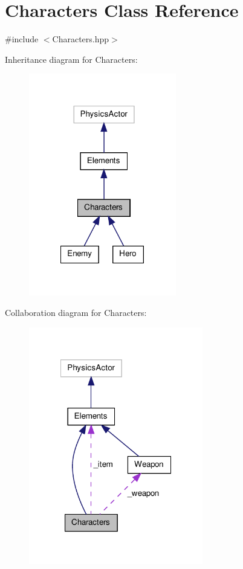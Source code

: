 \hypertarget{class_characters}{\section{Characters Class Reference}
\label{class_characters}
}


{\ttfamily \#include $<$Characters.\-hpp$>$}



Inheritance diagram for Characters\-:
\nopagebreak
\begin{figure}[H]
\begin{center}
\leavevmode
\includegraphics[width=182pt]{class_characters__inherit__graph}
\end{center}
\end{figure}


Collaboration diagram for Characters\-:
\nopagebreak
\begin{figure}[H]
\begin{center}
\leavevmode
\includegraphics[width=215pt]{class_characters__coll__graph}
\end{center}
\end{figure}
